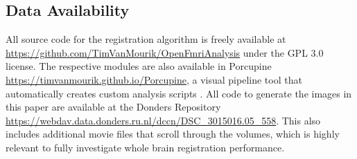 \subsection*{Data Availability}
All source code for the registration algorithm is freely available at \url{https://github.com/TimVanMourik/OpenFmriAnalysis} under the GPL 3.0 license. The respective modules are also available in Porcupine \url{https://timvanmourik.github.io/Porcupine}, a visual pipeline tool that automatically creates custom analysis scripts \citep{VanMourik2017}. All code to generate the images in this paper are available at the Donders Repository \url{https://webdav.data.donders.ru.nl/dccn/DSC\_3015016.05\_558}. This also includes additional movie files that scroll through the volumes, which is highly relevant to fully investigate whole brain registration performance. 



